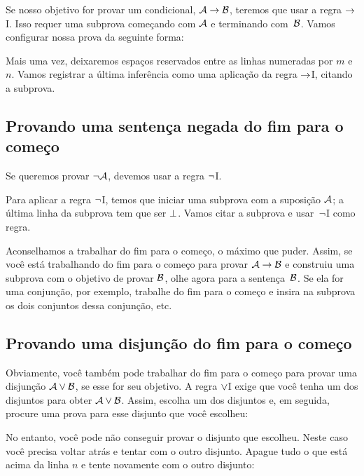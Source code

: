 Se nosso objetivo for provar um condicional,  $\mathcal{A} \rightarrow \mathcal{B}$, teremos que usar a regra $\rightarrow$I. Isso requer uma subprova começando com $\mathcal{A}$ e terminando com~$\mathcal{B}$. Vamos configurar nossa prova da seguinte forma:
\begin{fitchproof}
\open
{}
\ellipsesline 
{}
\close
{}
\end{fitchproof} 
Mais uma vez, deixaremos espaços reservados entre as  linhas numeradas por $m$ e $n$. Vamos registrar a última inferência como uma aplicação da regra $\rightarrow$I, citando a subprova.

\subsection*{Provando uma sentença negada do fim para o começo}

Se queremos provar $\neg \mathcal{A}$, devemos usar a regra $\neg$I.
\begin{fitchproof}
\open
{}
\ellipsesline 
{}
\close
{}
\end{fitchproof} 
Para aplicar a regra $\neg$I, temos que iniciar uma subprova com a suposição $\mathcal{A}$; a última linha da subprova tem que ser $\bot$.  Vamos citar a subprova e usar~$\neg$I como regra.  

Aconselhamos a trabalhar do fim para o começo,  o máximo que puder. Assim, se você está trabalhando do fim para o começo para provar $\mathcal{A} \rightarrow \mathcal{B}$ e construiu uma subprova com o objetivo de  provar $\mathcal{B}$,  olhe  agora para a sentença~$\mathcal{B}$. Se ela for uma conjunção, por exemplo, trabalhe do fim para o começo e insira na subprova os dois conjuntos dessa conjunção,  etc.


\subsection*{Provando uma disjunção do fim para o começo}

Obviamente, você também pode trabalhar do fim para o começo para provar  uma disjunção $\mathcal{A} \vee \mathcal{B}$, se esse for seu objetivo. A regra
 $\vee$I exige que você tenha um dos disjuntos para obter $\mathcal{A} \vee \mathcal{B}$.
 Assim, escolha um dos disjuntos e,  em seguida,  procure uma prova para esse  disjunto  que você escolheu:
\begin{fitchproof}
	\ellipsesline
\end{fitchproof}
 No entanto, você pode não conseguir provar o  disjunto que escolheu.  Neste caso você precisa voltar atrás e tentar com o outro disjunto. Apague tudo o que está acima da linha $n$ e tente novamente com o outro disjunto:

